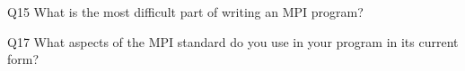 \begin{description}%
\item{Q15} What is the most difficult part of writing an MPI program?%
\item{Q17} What aspects of the MPI standard do you use in your program in its current form?%
\end{description}%
